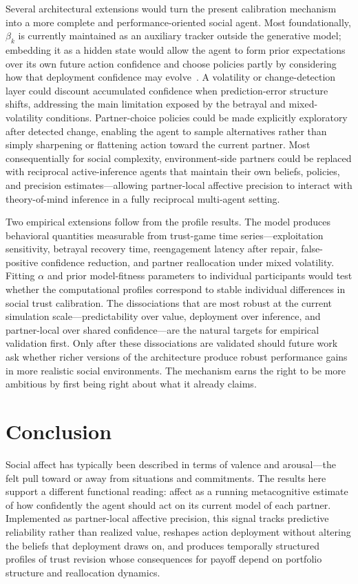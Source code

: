 Several architectural extensions would turn the present calibration mechanism into a more complete and performance-oriented social agent. Most foundationally, $\beta_k$ is currently maintained as an auxiliary tracker outside the generative model; embedding it as a hidden state would allow the agent to form prior expectations over its own future action confidence and choose policies partly by considering how that deployment confidence may evolve~\cite{Hesp2021DeeplyFeltAffect}. A volatility or change-detection layer could discount accumulated confidence when prediction-error structure shifts, addressing the main limitation exposed by the betrayal and mixed-volatility conditions. Partner-choice policies could be made explicitly exploratory after detected change, enabling the agent to sample alternatives rather than simply sharpening or flattening action toward the current partner. Most consequentially for social complexity, environment-side partners could be replaced with reciprocal active-inference agents that maintain their own beliefs, policies, and precision estimates---allowing partner-local affective precision to interact with theory-of-mind inference in a fully reciprocal multi-agent setting.

Two empirical extensions follow from the profile results. The model produces behavioral quantities measurable from trust-game time series---exploitation sensitivity, betrayal recovery time, reengagement latency after repair, false-positive confidence reduction, and partner reallocation under mixed volatility. Fitting $\alpha$ and prior model-fitness parameters to individual participants would test whether the computational profiles correspond to stable individual differences in social trust calibration. The dissociations that are most robust at the current simulation scale---predictability over value, deployment over inference, and partner-local over shared confidence---are the natural targets for empirical validation first. Only after these dissociations are validated should future work ask whether richer versions of the architecture produce robust performance gains in more realistic social environments. The mechanism earns the right to be more ambitious by first being right about what it already claims.

\section{Conclusion}
\label{sec:conclusion}

Social affect has typically been described in terms of valence and arousal---the felt pull toward or away from situations and commitments. The results here support a different functional reading: affect as a running metacognitive estimate of how confidently the agent should act on its current model of each partner. Implemented as partner-local affective precision, this signal tracks predictive reliability rather than realized value, reshapes action deployment without altering the beliefs that deployment draws on, and produces temporally structured profiles of trust revision whose consequences for payoff depend on portfolio structure and reallocation dynamics.


